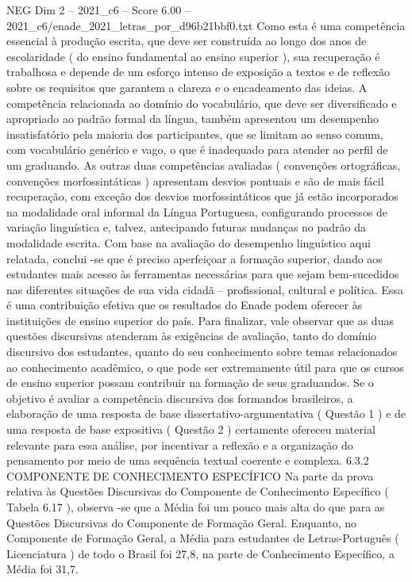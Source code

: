 \begin{textsample}{NEG Dim 2 – 2021\_c6 – Score 6.00 – 2021\_c6/enade\_2021\_letras\_por\_d96b21bbf0.txt}
Como esta é uma competência essencial à produção escrita, que deve ser construída ao longo dos anos de escolaridade ( do ensino fundamental ao ensino superior ), sua recuperação é trabalhosa e depende de um esforço intenso de exposição a textos e de reflexão sobre os requisitos que garantem a clareza e o encadeamento das ideias.
A competência relacionada ao domínio do vocabulário, que deve ser diversificado e apropriado ao padrão formal da língua, também apresentou um desempenho insatisfatório pela maioria dos participantes, que se limitam ao senso comum, com vocabulário genérico e vago, o que é inadequado para atender ao perfil de um graduando.
As outras duas competências avaliadas ( convenções ortográficas, convenções morfossintáticas ) apresentam desvios pontuais e são de mais fácil recuperação, com exceção dos desvios morfossintáticos que já estão incorporados na modalidade oral informal da Língua Portuguesa, configurando processos de variação linguística e, talvez, antecipando futuras mudanças no padrão da modalidade escrita.
Com base na avaliação do desempenho linguístico aqui relatada, conclui -se que é preciso aperfeiçoar a formação superior, dando aos estudantes mais acesso às ferramentas necessárias para que sejam bem-sucedidos nas diferentes situações de sua vida cidadã – profissional, cultural e política.
Essa é uma contribuição efetiva que os resultados do Enade podem oferecer às instituições de ensino superior do país.
Para finalizar, vale observar que as duas questões discursivas atenderam às exigências de avaliação, tanto do domínio discursivo dos estudantes, quanto do seu conhecimento sobre temas relacionados ao conhecimento acadêmico, o que pode ser extremamente útil para que os cursos de ensino superior possam contribuir na formação de seus graduandos.
Se o objetivo é avaliar a competência discursiva dos formandos brasileiros, a elaboração de uma resposta de base dissertativo-argumentativa ( Questão 1 ) e de uma resposta de base expositiva ( Questão 2 ) certamente ofereceu material relevante para essa análise, por incentivar a reflexão e a organização do pensamento por meio de uma sequência textual coerente e complexa. 6.3.2 COMPONENTE DE CONHECIMENTO ESPECÍFICO Na parte da prova relativa às Questões Discursivas do Componente de Conhecimento Específico ( Tabela 6.17 ), observa -se que a Média foi um pouco mais alta do que para as Questões Discursivas do Componente de Formação Geral.
Enquanto, no Componente de Formação Geral, a Média para estudantes de Letras-Português ( Licenciatura ) de todo o Brasil foi 27,8, na parte de Conhecimento Específico, a Média foi 31,7.

\end{textsample}
